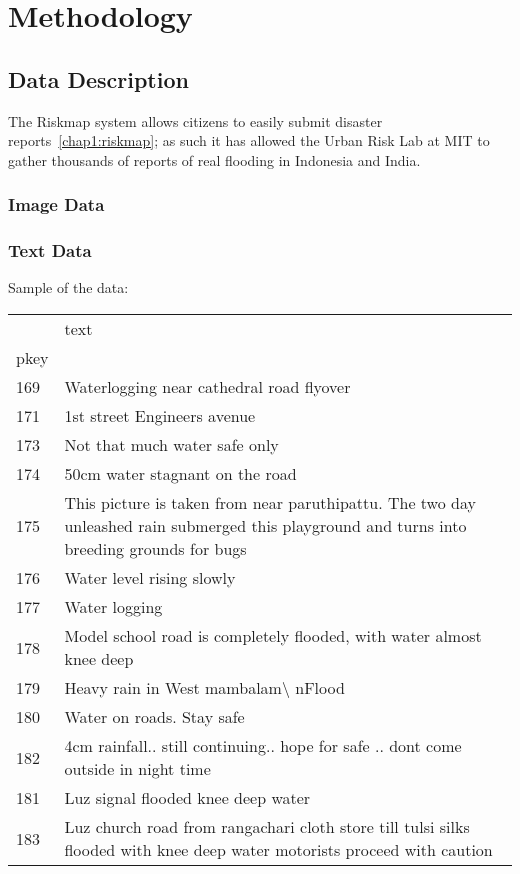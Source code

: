 \chapter{Methodology}
\section{Data Description}
The Riskmap system allows citizens to easily submit
disaster reports~\ref{chap1:riskmap}; as such it has allowed the Urban Risk Lab at
MIT to gather thousands of reports of real flooding in Indonesia and India.

\subsection{Image Data}

\subsection{Text Data}

Sample of the data:
\begin{tabular}{ll}
	\toprule
	{} &
	text \\
	pkey &
	\\
	\midrule
	169  &
	Waterlogging near cathedral road flyover  \\
	171  &
	1st street Engineers avenue \\
	173  &
	Not that much water safe only \\
	174  &
	50cm water stagnant on the road \\
	175  &  This picture is taken from near paruthipattu. The two day
	unleashed rain submerged this playground and turns into breeding grounds
	for bugs \\
	176  &
	Water level rising  slowly  \\
	177  &
	Water logging  \\
	178  &
	Model school road is completely flooded, with water almost knee deep \\
	179  &
	Heavy rain in West mambalam\textbackslash{} nFlood \\
	180  &
	Water on roads. Stay safe \\
	182  &                                                           4cm
	rainfall.. still continuing.. hope for safe .. dont come outside in
	night time \\
	181  &
	Luz signal flooded knee deep water \\
	183  &                    Luz church road from rangachari cloth store
	till tulsi silks flooded with knee deep water motorists proceed with
	caution  \\
	\bottomrule
\end{tabular}

